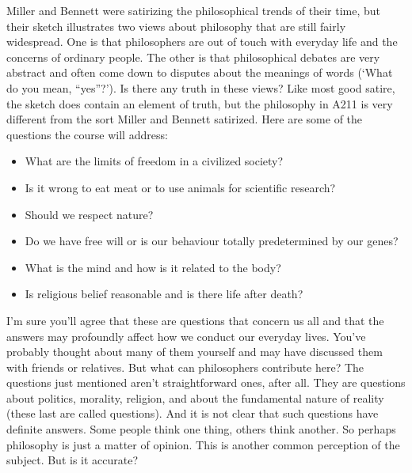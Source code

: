 \documentclass[letterpaper,10pt,english]{sphinxmanual}
\begin{document}
Miller and Bennett were satirizing the philosophical trends of their time, but their sketch illustrates two views about philosophy that are still fairly widespread. One is that philosophers are out of touch with everyday life and the concerns of ordinary people. The other is that philosophical debates are very abstract and often come down to disputes about the meanings of words (‘What do you mean, “yes”?’). Is there any truth in these views? Like most good satire, the  sketch
does contain an element of truth, but the philosophy in A211  is very different from the sort Miller and Bennett satirized. Here are some of the questions the course will address:
\begin{itemize}
\item {} 
What are the limits of freedom in a civilized society?

\item {} 
Is it wrong to eat meat or to use animals for scientific research?

\item {} 
Should we respect nature?

\item {} 
Do we have free will or is our behaviour totally predetermined by our genes?

\item {} 
What is the mind and how is it related to the body?

\item {} 
Is religious belief reasonable and is there life after death?

\end{itemize}

I’m sure you’ll agree that these are questions that concern us all and that the answers may profoundly affect how we conduct our everyday lives. You’ve probably thought about many of them yourself and may have discussed them with friends or relatives. But what can philosophers contribute here? The questions just mentioned aren’t straightforward ones, after all. They are questions about politics, morality, religion, and about the fundamental nature of reality (these last are called 
questions). And it is not clear that such questions have definite answers. Some people think one thing, others think another. So perhaps philosophy is just a matter of opinion. This is another common perception of the subject. But is it accurate?
\end{document}
